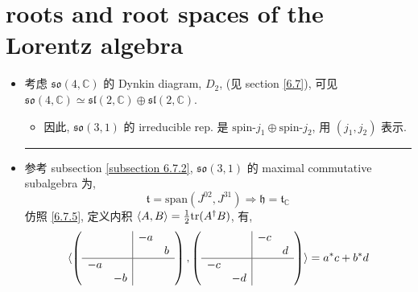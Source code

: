 \section{roots and root spaces of the Lorentz algebra}
\begin{itemize}
	\item 考虑 $\mathfrak{so}(4, \mathbb{C})$ 的 Dynkin diagram, $D_2$, (见 section \ref{6.7}), 可见 $\mathfrak{so}(4, \mathbb{C}) \simeq \mathfrak{sl}(2, \mathbb{C}) \oplus \mathfrak{sl}(2, \mathbb{C})$.
	\begin{itemize}
		\item 因此, $\mathfrak{so}(3, 1)$ 的 irreducible rep. 是 $\text{spin-} j_1 \oplus \text{spin-} j_2$, 用 $(j_1, j_2)$ 表示.
	\end{itemize}
	
	\noindent\rule[0.5ex]{\linewidth}{0.5pt} %
	
	\item 参考 subsection \ref{subsection 6.7.2}, $\mathfrak{so}(3, 1)$ 的 maximal commutative subalgebra 为,
	\begin{equation}
		\mathfrak{t} = \mathrm{span}(J^{0 2}, J^{3 1}) \Longrightarrow \mathfrak{h} = \mathfrak{t}_\mathbb{C}
	\end{equation}
	仿照 \eqref{6.7.5}, 定义内积 $\braket{A, B} = \frac{1}{2} \mathrm{tr}(A^\dag B)$, 有,
	\begin{equation}
		\braket{\left( \begin{array}{cc|cc}
				& & - a & \\
				& & & b \\
				\hline
				- a & & & \\
				& - b & &
			\end{array} \right), \left( \begin{array}{cc|cc}
				& & - c & \\
				& & & d \\
				\hline
				- c & & & \\
				& - d & &
			\end{array} \right)
		} = a^* c + b^* d
	\end{equation}
	

\end{itemize}
